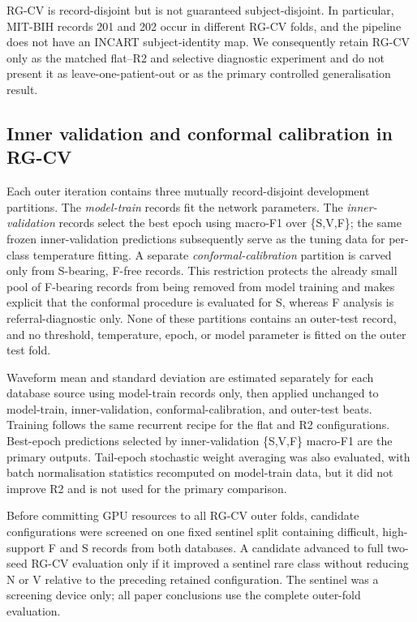 \documentclass[pdflatex,sn-mathphys-num]{sn-jnl}
\begin{document}
RG-CV is record-disjoint but is not guaranteed subject-disjoint. In particular,
MIT-BIH records 201 and 202 occur in different RG-CV folds, and the pipeline
does not have an INCART subject-identity map. We consequently retain RG-CV only
as the matched flat--R2 and selective diagnostic experiment and do not present
it as leave-one-patient-out or as the primary controlled generalisation result.

\subsection{Inner validation and conformal calibration in RG-CV}

Each outer iteration contains three mutually record-disjoint development
partitions. The \emph{model-train} records fit the network parameters. The
\emph{inner-validation} records select the best epoch using macro-F1 over
\{S,V,F\}; the same frozen inner-validation predictions subsequently serve as
the tuning data for per-class temperature fitting. A separate
\emph{conformal-calibration} partition is carved only from S-bearing, F-free
records. This restriction protects the already small pool of F-bearing records
from being removed from model training and makes explicit that the conformal
procedure is evaluated for S, whereas F analysis is referral-diagnostic only.
None of these partitions contains an outer-test record, and no threshold,
temperature, epoch, or model parameter is fitted on the outer test fold.

Waveform mean and standard deviation are estimated separately for each database
source using model-train records only, then applied unchanged to model-train,
inner-validation, conformal-calibration, and outer-test beats. Training follows
the same recurrent recipe for the flat and R2 configurations. Best-epoch
predictions selected by inner-validation \{S,V,F\} macro-F1 are the primary
outputs. Tail-epoch stochastic weight averaging was also evaluated, with batch
normalisation statistics recomputed on model-train data, but it did not improve
R2 and is not used for the primary comparison.

Before committing GPU resources to all RG-CV outer folds, candidate configurations
were screened on one fixed sentinel split containing difficult, high-support F
and S records from both databases. A candidate advanced to full two-seed RG-CV
evaluation only if it improved a sentinel rare class without reducing N or V
relative to the preceding retained configuration. The sentinel was a screening
device only; all paper conclusions use the complete outer-fold evaluation.
\end{document}
